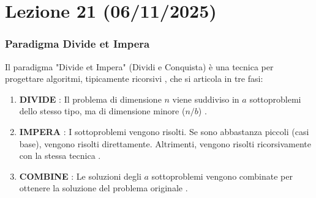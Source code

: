 
\part{Lezione 21 (06/11/2025) }

\section{Paradigma Divide et Impera }
Il paradigma "Divide et Impera" (Dividi e Conquista) è una tecnica per progettare algoritmi, tipicamente ricorsivi , che si articola in tre fasi:

\begin{definition}
\begin{enumerate}
    \item \textbf{DIVIDE} : Il problema di dimensione $n$ viene suddiviso in $a$ sottoproblemi dello stesso tipo, ma di dimensione minore ($n/b$) .
    \item \textbf{IMPERA} : I sottoproblemi vengono risolti. Se sono abbastanza piccoli (casi base), vengono risolti direttamente. Altrimenti, vengono risolti ricorsivamente con la stessa tecnica .
    \item \textbf{COMBINE} : Le soluzioni degli $a$ sottoproblemi vengono combinate per ottenere la soluzione del problema originale .
\end{enumerate}
\end{definition}

